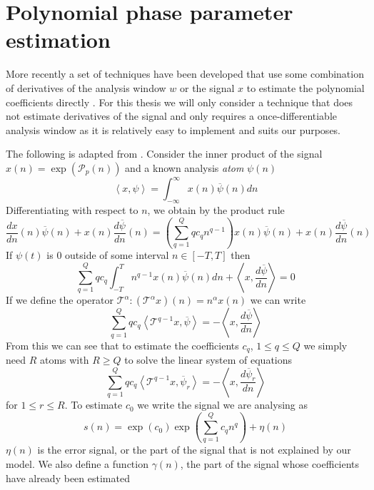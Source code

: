 \section{Polynomial phase parameter estimation}
\label{sec:ddm_description}
More recently a set of techniques have been developed that use some combination
of derivatives of the analysis window $w$ or the signal $x$ to estimate the
polynomial coefficients directly \cite{hamilton2011non}. For this thesis we will
only consider a technique that does not estimate derivatives of the signal and
only requires a once-differentiable analysis window as it is relatively easy to
implement and suits our purposes.

The following is adapted from \cite{betser2009sinusoidal}. Consider the inner
product of the signal $x(n) = \exp(\mathcal{P}_p(n)) $ and a
known analysis \textit{atom} $\psi(n)$
\[
    \left\langle x,\psi \right\rangle =
    \int_{-\infty}^{\infty}x(n)\overline{\psi}(n)dn
\]
Differentiating with respect to $n$, we obtain by the product rule
\[
    \frac{dx}{dn}(n)\overline{\psi}(n)
    + x(n)\frac{d\overline{\psi}}{dn}(n)
    = \left( \sum_{q=1}^{Q} q c_q n^{q-1} \right) x(n)\overline{\psi}(n)
    + x(n)\frac{d\overline{\psi}}{dn}(n)
\]
If $\psi(t)$ is 0 outside of some interval $n \in [-T,T]$ then
\[
    \sum_{q=1}^{Q} q c_q \int_{-T}^{T} n^{q-1} x(n) \overline{\psi}(n) dn
    + \left\langle x, \frac{d\overline{\psi}}{dn} \right\rangle = 0
\]
If we define the operator $\mathcal{T}^{\alpha} : (\mathcal{T}^{\alpha}x)(n) =
n^{\alpha}x(n)$ we can write
\[ 
    \sum_{q=1}^{Q} q c_q 
    \left\langle \mathcal{T}^{q-1} x , \overline{\psi} \right\rangle
    = -\left\langle x, \frac{d\overline{\psi}}{dn} \right\rangle
\]
From this we can see that to estimate the coefficients $c_q$, $ 1 \leq q \leq Q
$ we simply need $R$ atoms with $R \geq Q$ to solve the linear system of
equations
\begin{equation}
    \label{eq:ddmsyseq}
    \sum_{q=1}^{Q} q c_q 
    \left\langle \mathcal{T}^{q-1} x , \overline{\psi}_{r} \right\rangle
    = -\left\langle x, \frac{d\overline{\psi}_{r}}{dn} \right\rangle
\end{equation}
for $1 \leq r \leq R$. To estimate $c_0$ we write the signal we are analysing as
\[
    s(n) = \exp(c_0) \exp \left( \sum_{q=1}^{Q} c_q n^{q} \right) + \eta (n)
\]
$\eta (n)$ is the error signal, or the part of the signal that is not explained
by our model. We also define a function $\gamma (n)$, the part of the signal
whose coefficients have already been estimated
